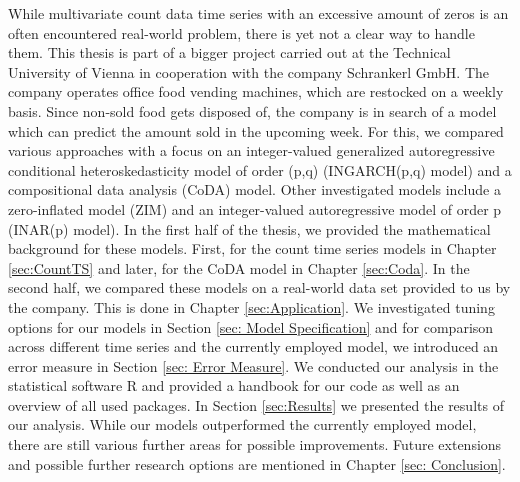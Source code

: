 While multivariate count data time series with an excessive amount of zeros is an often encountered real-world problem, there is yet not a clear way to handle them. This thesis is part of a bigger project carried out at the Technical University of Vienna in cooperation with the company Schrankerl GmbH. The company operates office food vending machines, which are restocked on a weekly basis. Since non-sold food gets disposed of, the company is in search of a model which can predict the amount sold in the upcoming week. For this, we compared various approaches with a focus on an integer-valued generalized autoregressive conditional heteroskedasticity model of order (p,q) (INGARCH(p,q) model) and a compositional data analysis (CoDA) model. Other investigated models include a zero-inflated model (ZIM) and an integer-valued autoregressive model of order p (INAR(p) model). In the first half of the thesis, we provided the mathematical background for these models. First, for the count time series models in Chapter \ref{sec:CountTS} and later, for the CoDA model in Chapter \ref{sec:Coda}. In the second half, we compared these models on a real-world data set provided to us by the company. This is done in Chapter \ref{sec:Application}. We investigated tuning options for our models in Section \ref{sec: Model Specification} and for comparison across different time series and the currently employed model, we introduced an error measure in Section \ref{sec: Error Measure}. We conducted our analysis in the statistical software R and provided a handbook for our code as well as an overview of all used packages. In Section \ref{sec:Results} we presented the results of our analysis.  While our models outperformed the currently employed model, there are still various further areas for possible improvements. Future extensions and possible further research options are mentioned in Chapter \ref{sec: Conclusion}. 